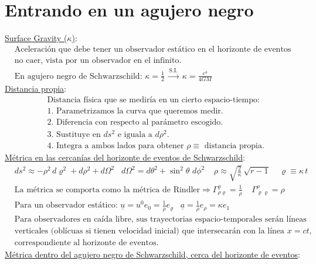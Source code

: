 \section*{Entrando en un agujero negro}
\underline{Surface Gravity ($\kappa$)}: 
\begin{align*}
    &\text{Aceleración que debe tener un observador estático en el horizonte de eventos para}\\
    &\text{no caer, vista por un observador en el infinito.}\\
    &\text{En agujero negro de Schwarzschild: } \kappa= \frac{1}{2} \; \xrightarrow{\text{S.I.}}\; \kappa= \frac{c^4}{4GM}
\end{align*}
\underline{Distancia propia}:
\begin{align*}
    &\text{Distancia física que se mediría en un cierto espacio-tiempo:}\\
    &1. \text{ Parametrizamos la curva que queremos medir.}\\
    &2. \text{ Diferencia con respecto al parámetro escogido.}\\
    &3. \text{ Sustituye en $ds^2$ e iguala a $d\rho^2$.}\\
    &4. \text{ Integra a ambos lados para obtener $\rho\equiv$ distancia propia.}
\end{align*}
\underline{Métrica en las cercanías del horizonte de eventos de Schwarzschild}: 
\begin{align*}
    &ds^2 \approx - \rho^2 \,d\varrho^2+ d\rho ^2 + d\Omega^2\; \; \; d\Omega^2=d\theta^2 + \sin^2 \theta\,\,d\phi^2 \; \; \; \; \rho\approx \sqrt{\frac{2}{\kappa}}\,\sqrt{r-1}\; \; \; \; \varrho\equiv \kappa \,t\\
    &\text{La métrica se comporta como la métrica de Rindler} \Rightarrow \Gamma^\varrho_{\rho \varrho}= \frac{1}{\rho}\; \; \; \; \Gamma^\rho_{\varrho \varrho}= \rho \\
    &\text{Para un observador estático: }\underline{u}=u^0e_0= \frac{1}{\rho}e_\varrho\; \; \; \underline{a}=\frac{1}{\rho}e_\rho=\kappa e_1\\
    &\text{Para observadores en caída libre, sus trayectorias espacio-temporales serán líneas}\\
    &\text{verticales (oblícuas si tienen velocidad inicial) que intersecarán con la línea $x=ct$,}\\
    &\text{correspondiente al horizonte de eventos.}
\end{align*}
\underline{Métrica dentro del agujero negro de Schwarzschild, cerca del horizonte de eventos}:
